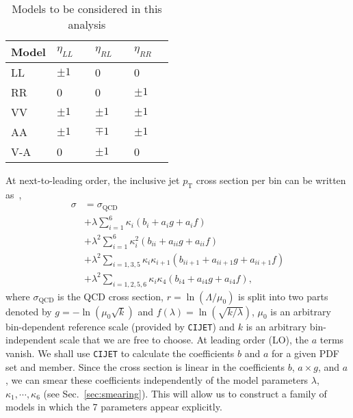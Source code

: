 \documentclass[aps,prd,preprint,nofootinbib]{revtex4}
\begin{document}
\begin{table}[htp]
\caption{Models to be considered in this analysis}
\label{tab:models}
\medskip
 \begin{tabular}{l|lll}
 \hline
 Model	&	$\eta_{LL}\quad$	&  $\eta_{RL}\quad$	& $\eta_{RR}\quad$ \\ \hline \hline
 LL		& 	$\pm 1$	 	& 0			& 0 \\
 RR		& 	0	 		& 0			& $\pm 1$ \\
 VV		& 	$\pm 1$	 	& $\pm 1$		& $\pm 1$ \\
 AA		& 	$\pm 1$	 	& $\mp 1$		& $\pm 1$ \\
 V-A		& 	0	 		& $\pm 1$			& 0 \
\end{tabular}
\end{table}
At next-to-leading order,  the inclusive jet $p_\textrm{T}$ cross section per bin can be written as~\cite{bib:CIJET},
\begin{align}
	\sigma 	&= \sigma_\textrm{QCD} \nonumber\\
			&+ \lambda \sum_{i=1}^6 \kappa_i (b_i + a_i g + a_i f) \nonumber\\
			&+ \lambda^2 \sum_{i=1}^6 \kappa_i^2 (b_{ii} + a_{ii} g + a_{ii} f) \nonumber\\
			&+ \lambda^2 \sum_{i=1,3,5} \kappa_i \kappa_{i+1} (b_{ii+1} + a_{ii+1} g + a_{ii+1} f) \nonumber\\
			&+ \lambda^2 \sum_{i=1,2,5,6} \kappa_i \kappa_{4} (b_{i4} + a_{i4} g + a_{i4} f),		
	 \label{eq:sigma}
\end{align}
where $\sigma_\textrm{QCD}$ is the QCD cross section, $r = \ln(\Lambda/\mu_0)$ is split into two parts denoted by $g = - \ln(\mu_0 \sqrt{k})$ and
$f(\lambda) = \ln(\sqrt{k/\lambda})$, $\mu_0$ is an arbitrary bin-dependent reference scale (provided by {\tt CIJET}) and $k$ is an arbitrary bin-independent scale that we are free to choose. At leading order (LO), the $a$ terms vanish.
We shall use {\tt CIJET} to calculate the coefficients $b$ and $a$ for a given
PDF set and member. Since the cross section is linear in the coefficients $b$, $a \times g$, and $a$, we can smear these coefficients independently of the model parameters $\lambda$, $\kappa_1,\cdots,\kappa_6$ (see Sec.~\ref{sec:smearing}). This will allow us to
construct a family of  models in which the 7 parameters appear explicitly.
\end{document}
